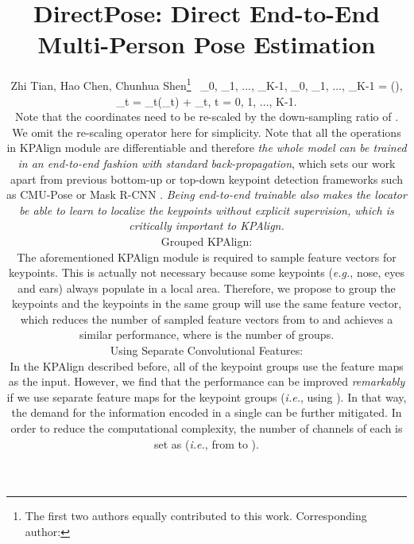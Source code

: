 \documentclass[10pt,twocolumn,letterpaper]{article}
\renewcommand{\texttt}[1]{}
\def\eg{{\it e.g.}\xspace}
\def\ie{{\it i.e.}\xspace}
\newcommand{\1}{{\mathbbm{1}}}
\begin{document}
\title{DirectPose: Direct End-to-End Multi-Person Pose Estimation}

\author{Zhi Tian, Hao Chen, Chunhua Shen\thanks{The first two authors
equally contributed to this work. Corresponding author: \texttt{chunhua.shen@adelaide.edu.au} }
\
\vo_0, \vo_1, ..., \vo_{K-1}, \vv_0, \vv_1, ..., \vv_{K-1} = \zeta(\mF),

	\vx_t = \phi_t(\vv_t) + \vo_t, \qquad t = 0, 1, ..., K-1.

Note that the coordinates need to be re-scaled by the down-sampling ratio of . We omit the re-scaling operator here for simplicity. Note that all the operations in KPAlign module are differentiable and therefore {\it the whole model can be trained in an end-to-end fashion with standard back-propagation}, which sets our work apart from previous bottom-up or top-down keypoint detection frameworks such as CMU-Pose \cite{cao2017realtime} or Mask R-CNN \cite{he2017mask}. \emph{Being end-to-end trainable also makes the locator
be able to
learn to localize the keypoints without explicit supervision, which is
critically
important to KPAlign.
}


\paragraph{Grouped KPAlign:} The aforementioned KPAlign module is required to sample  feature vectors for  keypoints. This is actually not necessary because some keypoints (\eg, nose, eyes and ears) always populate in a local area. Therefore, we propose to group the keypoints and the keypoints in the same group will use the same feature vector, which reduces the number of sampled feature vectors from  to  and achieves a similar performance, where  is the number of groups.
\paragraph{Using Separate Convolutional Features:} In the KPAlign described before, all of the keypoint groups use the feature maps  as the input. However, we find that the performance can be improved \emph{remarkably} if we use separate feature maps for the  keypoint groups (\ie, using ). In that way, the demand for the information encoded in a single  can be further mitigated. In order to reduce the computational complexity, the number of channels of each  is set as  (\ie, from  to ).
}
\end{document}
